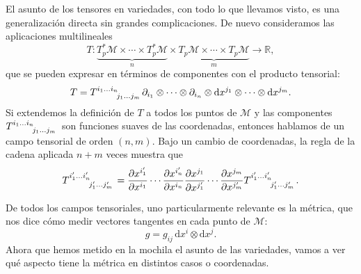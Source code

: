 El asunto de los tensores en variedades, con todo lo que llevamos visto, es una generalización directa sin grandes complicaciones. De nuevo consideramos las aplicaciones multilineales 
\begin{equation}
    T:\underset{n}{\underbrace{T_p^*\mathcal{M}\times\cdots\times T_p^*\mathcal{M}}} \times\underset{m}{\underbrace{T_p\mathcal{M}\times\cdots\times T_p\mathcal{M}}} \rightarrow \mathbb{R},
\end{equation}
que se pueden expresar en términos de componentes con el producto tensorial:
\begin{equation}
    T = \tensor{T}{^{i_1}^{...}^{i_n}_{j_1}_{...}_{j_m}}\partial_{i_1}\otimes\cdots\otimes\partial_{i_n}\otimes\mathrm{d}x^{j_1}\otimes\cdots\otimes\mathrm{d}x^{j_m}.
\end{equation}
Si extendemos la definición de \(T\) a todos los puntos de \(\mathcal{M}\) y las componentes \(\tensor{T}{^{i_1}^{...}^{i_n}_{j_1}_{...}_{j_m}}\) son funciones suaves de las coordenadas, entonces hablamos de un campo tensorial de orden \((n,m)\). Bajo un cambio de coordenadas, la regla de la cadena aplicada \(n+m\) veces muestra que
\begin{equation}
    \tensor{T}{^{i'_1}^{...}^{i'_n}_{j'_1}_{...}_{j'_m}} = 
    \frac{\partial x^{i'_1}}{\partial x^{i_1}}\cdots\frac{\partial x^{i'_n}}{\partial x^{i_n}} \frac{\partial x^{j_1}}{\partial x^{j'_1}}\cdots\frac{\partial x^{j_m}}{\partial x^{j'_m}}
    \tensor{T}{^{i'_1}^{...}^{i'_n}_{j'_1}_{...}_{j'_m}}.
\end{equation}

De todos los campos tensoriales, uno particularmente relevante es la métrica, que nos dice cómo medir vectores tangentes en cada punto de \(\mathcal{M}\):
\begin{equation}
    g = g_{ij}\, \mathrm{d}x^i\otimes \mathrm{d}x^j.
\end{equation}
Ahora que hemos metido en la mochila el asunto de las variedades, vamos a ver qué aspecto tiene la métrica en distintos casos o coordenadas.

